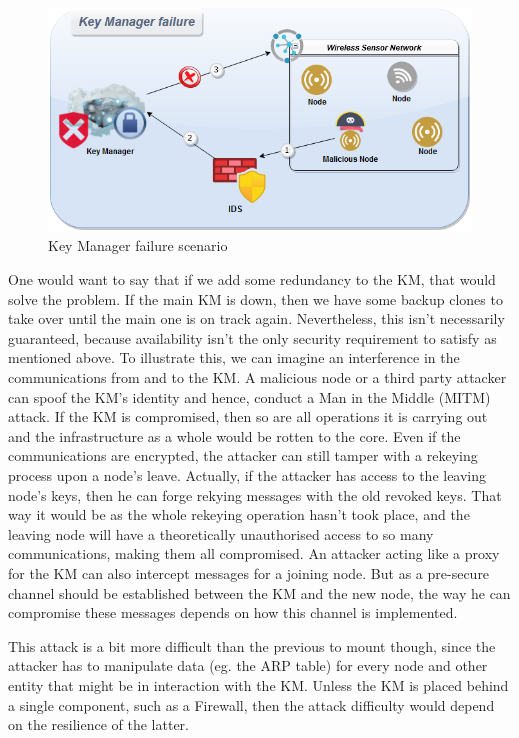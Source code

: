 \begin{figure}[htbp]
	\centerline{\includegraphics[scale=0.55]{figures/mgkmp/failure.png}}
	\caption{Key Manager failure scenario}
	\label{fig:km_failure}
\end{figure}

One would want to say that if we add some redundancy to the KM, that would solve the problem. If the main KM is down, then we have some backup clones to take over until the main one is on track again. Nevertheless, this isn’t necessarily guaranteed, because availability isn’t the only security requirement to satisfy as mentioned above. To illustrate this, we can imagine an interference in the communications from and to the KM. A malicious node or a third party attacker can spoof the KM’s identity and hence, conduct a Man in the Middle (MITM) attack. If the KM is compromised, then so are all operations it is carrying out and the infrastructure as a whole would be rotten to the core. Even if the communications are encrypted, the attacker can still tamper with a rekeying process upon a node’s leave. Actually, if the attacker has access to the leaving node’s keys, then he can forge rekying messages with the old revoked keys. That way it would be as the whole rekeying operation hasn’t took place, and the leaving node will have a theoretically unauthorised access to so many communications, making them all compromised. An attacker acting like a proxy for the KM can also intercept messages for a joining node. But as a pre-secure channel should be established between the KM and the new node, the way he can compromise these messages depends on how this channel is implemented.

This attack is a bit more difficult than the previous to mount though, since the attacker has to manipulate data (eg. the ARP table) for every node and other entity that might be in interaction with the KM. Unless the KM is placed behind a single component, such as a Firewall, then the attack difficulty would depend on the resilience of the latter.


